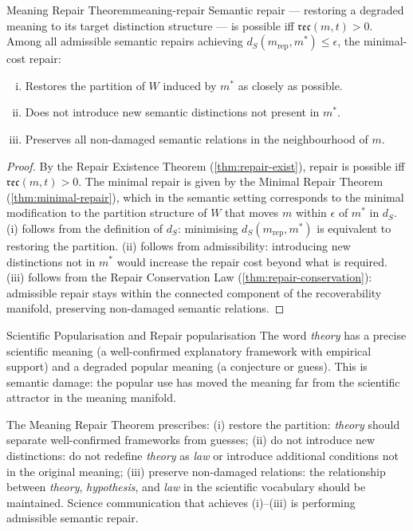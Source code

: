 \documentclass[12pt,twoside,openright]{book}
\newcommand{\reco}{\mathfrak{rec}}
\begin{document}
\begin{theorem}{Meaning Repair Theorem}{meaning-repair}
  Semantic repair — restoring a degraded meaning to
  its target distinction structure — is possible iff
  $\reco(m, t) > 0$.
  Among all admissible semantic repairs achieving
  $d_S(m_\mathrm{rep}, m^*) \le \epsilon$,
  the minimal-cost repair:
  \begin{enumerate}[(i)]
    \item Restores the partition of $W$ induced by $m^*$
          as closely as possible.
    \item Does not introduce new semantic distinctions
          not present in $m^*$.
    \item Preserves all non-damaged semantic relations
          in the neighbourhood of $m$.
  \end{enumerate}
\end{theorem}

\begin{proof}
  By the Repair Existence Theorem
  (\cref{thm:repair-exist}), repair is possible iff
  $\reco(m,t) > 0$.
  The minimal repair is given by the Minimal Repair
  Theorem (\cref{thm:minimal-repair}), which in the
  semantic setting corresponds to the minimal
  modification to the partition structure of $W$
  that moves $m$ within $\epsilon$ of $m^*$ in $d_S$.
  (i) follows from the definition of $d_S$: minimising
  $d_S(m_\mathrm{rep}, m^*)$ is equivalent to
  restoring the partition.
  (ii) follows from admissibility: introducing new
  distinctions not in $m^*$ would increase
  the repair cost beyond what is required.
  (iii) follows from the Repair Conservation Law
  (\cref{thm:repair-conservation}): admissible repair
  stays within the connected component of the
  recoverability manifold, preserving non-damaged
  semantic relations.
\end{proof}

\begin{example}{Scientific Popularisation and Repair}%
  {popularisation}
  The word \emph{theory} has a precise scientific
  meaning (a well-confirmed explanatory framework
  with empirical support) and a degraded popular
  meaning (a conjecture or guess).
  This is semantic damage: the popular use has moved
  the meaning far from the scientific attractor in
  the meaning manifold.

  The Meaning Repair Theorem prescribes:
  (i) restore the partition: \emph{theory} should
  separate well-confirmed frameworks from guesses;
  (ii) do not introduce new distinctions: do not
  redefine \emph{theory} as \emph{law} or introduce
  additional conditions not in the original meaning;
  (iii) preserve non-damaged relations: the relationship
  between \emph{theory}, \emph{hypothesis}, and
  \emph{law} in the scientific vocabulary should be
  maintained.
  Science communication that achieves (i)--(iii) is
  performing admissible semantic repair.
\end{example}
\end{document}
